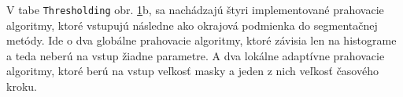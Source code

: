 \documentclass[a4paper,12pt,twoside]{article}%
\begin{document}
V tabe \texttt{Thresholding} obr. \ref{fig:uidata}b, sa nachádzajú štyri implementované prahovacie algoritmy, ktoré vstupujú  následne ako okrajová podmienka do segmentačnej metódy. Ide o dva globálne prahovacie algoritmy, ktoré závisia len na histograme a teda neberú na vstup žiadne parametre. A dva lokálne adaptívne prahovacie algoritmy, ktoré berú na vstup veľkosť masky a jeden z nich veľkosť časového kroku.


\begin{figure}[H]%
    \begin{center} 
    \qquad
    \caption{}%
    \label{fig:uidata}%
     \end{center} 
\end{figure}
\end{document}
